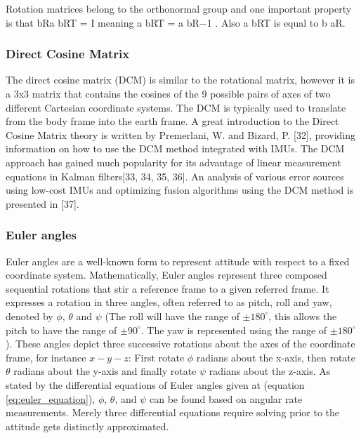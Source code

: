 Rotation matrices belong to the orthonormal group and one important property is that bRa bRT = I meaning a bRT = a bR−1 . Also a bRT is equal to b aR.

\subsubsection{Direct Cosine Matrix}

The direct cosine matrix (DCM) is similar to the rotational matrix, however it is a 3x3
matrix that contains the cosines of the 9 possible pairs of axes of two different Cartesian coordinate systems. The DCM is typically used to translate from the body frame into the earth frame. A great introduction to the Direct Cosine Matrix theory is written by Premerlani, W. and Bizard, P. [32], providing information on how to use the DCM method
integrated with IMUs. The DCM approach has gained much popularity for its advantage of
linear measurement equations in Kalman filters[33, 34, 35, 36]. An analysis of various error sources using low-cost IMUs and optimizing fusion algorithms using the DCM method is
presented in [37].


\subsubsection{Euler angles}

Euler angles are a well-known form to represent attitude with respect to a fixed coordinate system. Mathematically, Euler angles represent three composed sequential rotations that stir a reference frame to a given referred frame. It expresses a rotation in three angles, often referred to as pitch, roll and yaw, denoted by $\phi$, $\theta$ and $\psi$ (The roll will have the range of $\pm180^\circ$, this allows the pitch to have the range of $\pm90^{\circ}$. The yaw is represented using the range of $\pm180^{\circ}$). These angles depict three successive rotations about the axes of the coordinate frame, for instance $x-y-z$: First rotate $\phi$ radians about the x-axis, then rotate $\theta$ radians about the y-axis and finally rotate $\psi$ radians about the z-axis. As stated by the differential equations of Euler angles given at (equation \ref{eq:euler_equation}), $\phi$, $\theta$, and $\psi$ can be found based on angular rate measurements. Merely three differential equations require solving prior to the attitude gets distinctly approximated.

